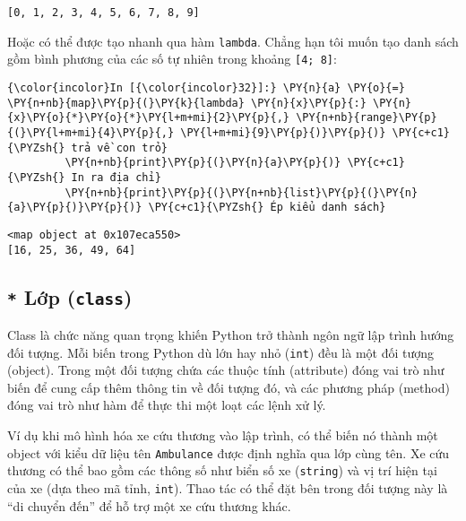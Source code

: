     \begin{Verbatim}[commandchars=\\\{\}]
[0, 1, 2, 3, 4, 5, 6, 7, 8, 9]

    \end{Verbatim}

    Hoặc có thể được tạo nhanh qua hàm \texttt{lambda}. Chẳng hạn tôi muốn
tạo danh sách gồm bình phương của các số tự nhiên trong khoảng
\texttt{{[}4;\ 8{]}}:

    
\begin{Verbatim}[commandchars=\\\{\}]
{\color{incolor}In [{\color{incolor}32}]:} \PY{n}{a} \PY{o}{=} \PY{n+nb}{map}\PY{p}{(}\PY{k}{lambda} \PY{n}{x}\PY{p}{:} \PY{n}{x}\PY{o}{*}\PY{o}{*}\PY{l+m+mi}{2}\PY{p}{,} \PY{n+nb}{range}\PY{p}{(}\PY{l+m+mi}{4}\PY{p}{,} \PY{l+m+mi}{9}\PY{p}{)}\PY{p}{)} \PY{c+c1}{\PYZsh{} trả về con trỏ}
         \PY{n+nb}{print}\PY{p}{(}\PY{n}{a}\PY{p}{)} \PY{c+c1}{\PYZsh{} In ra địa chỉ}
         \PY{n+nb}{print}\PY{p}{(}\PY{n+nb}{list}\PY{p}{(}\PY{n}{a}\PY{p}{)}\PY{p}{)} \PY{c+c1}{\PYZsh{} Ép kiểu danh sách}
\end{Verbatim}
    

    \begin{Verbatim}[commandchars=\\\{\}]
<map object at 0x107eca550>
[16, 25, 36, 49, 64]

    \end{Verbatim}

    \subsection{\texorpdfstring{\texttt{*} Lớp
(\texttt{class})}{* Lớp (class)}}\label{lux1edbp-class}

    Class là chức năng quan trọng khiến Python trở thành ngôn ngữ lập trình
hướng đối tượng. Mỗi biến trong Python dù lớn hay nhỏ (\texttt{int}) đều
là một đối tượng (object). Trong một đối tượng chứa các thuộc tính
(attribute) đóng vai trò như biến để cung cấp thêm thông tin về đối
tượng đó, và các phương pháp (method) đóng vai trò như hàm để thực thi
một loạt các lệnh xử lý.

Ví dụ khi mô hình hóa xe cứu thương vào lập trình, có thể biến nó thành
một object với kiểu dữ liệu tên \texttt{Ambulance} được định nghĩa qua
lớp cùng tên. Xe cứu thương có thể bao gồm các thông số như biển số xe
(\texttt{string}) và vị trí hiện tại của xe (dựa theo mã tỉnh,
\texttt{int}). Thao tác có thể đặt bên trong đối tượng này là ``di
chuyển đến'' để hỗ trợ một xe cứu thương khác.

